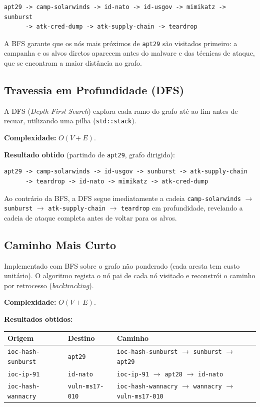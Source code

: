 \documentclass[12pt,a4paper]{article}
\begin{document}
\begin{lstlisting}
apt29 -> camp-solarwinds -> id-nato -> id-usgov -> mimikatz -> sunburst
      -> atk-cred-dump -> atk-supply-chain -> teardrop
\end{lstlisting}

A BFS garante que os nós mais próximos de \texttt{apt29} são visitados primeiro: a campanha e os alvos diretos aparecem antes do malware e das técnicas de ataque, que se encontram a maior distância no grafo.

\subsection{Travessia em Profundidade (DFS)}

A DFS (\emph{Depth-First Search}) explora cada ramo do grafo até ao fim antes de recuar, utilizando uma pilha (\texttt{std::stack}).

\medskip
\noindent\textbf{Complexidade:} $O(V + E)$.

\medskip
\noindent\textbf{Resultado obtido} (partindo de \texttt{apt29}, grafo dirigido):

\begin{lstlisting}
apt29 -> camp-solarwinds -> id-usgov -> sunburst -> atk-supply-chain
      -> teardrop -> id-nato -> mimikatz -> atk-cred-dump
\end{lstlisting}

Ao contrário da BFS, a DFS segue imediatamente a cadeia \texttt{camp-solarwinds} $\to$ \texttt{sunburst} $\to$ \texttt{atk-supply-chain} $\to$ \texttt{teardrop} em profundidade, revelando a cadeia de ataque completa antes de voltar para os alvos.

\subsection{Caminho Mais Curto}

Implementado com BFS sobre o grafo não ponderado (cada aresta tem custo unitário). O algoritmo regista o nó pai de cada nó visitado e reconstrói o caminho por retrocesso (\emph{backtracking}).

\medskip
\noindent\textbf{Complexidade:} $O(V + E)$.

\medskip
\noindent\textbf{Resultados obtidos:}

\begin{center}
\begin{tabular}{lll}
\toprule
\textbf{Origem} & \textbf{Destino} & \textbf{Caminho} \\
\midrule
\texttt{ioc-hash-sunburst} & \texttt{apt29}       & \texttt{ioc-hash-sunburst} $\to$ \texttt{sunburst} $\to$ \texttt{apt29} \\
\texttt{ioc-ip-91}         & \texttt{id-nato}     & \texttt{ioc-ip-91} $\to$ \texttt{apt28} $\to$ \texttt{id-nato} \\
\texttt{ioc-hash-wannacry} & \texttt{vuln-ms17-010} & \texttt{ioc-hash-wannacry} $\to$ \texttt{wannacry} $\to$ \texttt{vuln-ms17-010} \\
\bottomrule
\end{tabular}
\end{center}
\end{document}

